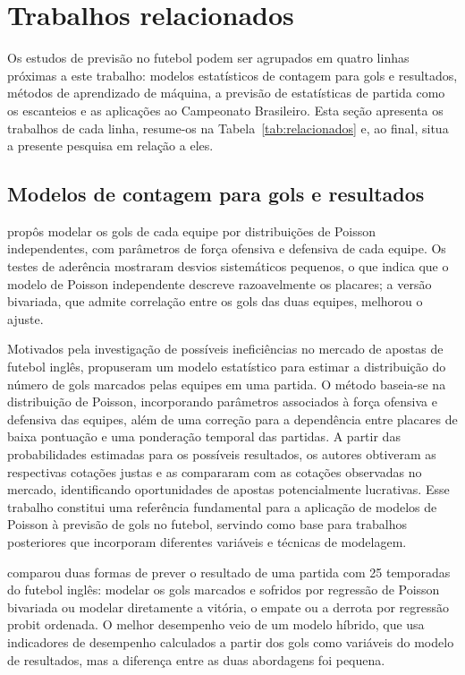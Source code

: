 \section{Trabalhos relacionados}\label{sec:Related}

Os estudos de previsão no futebol podem ser agrupados em quatro linhas próximas a este trabalho: modelos estatísticos de contagem para gols e resultados, métodos de aprendizado de máquina, a previsão de estatísticas de partida como os escanteios e as aplicações ao Campeonato Brasileiro. Esta seção apresenta os trabalhos de cada linha, resume-os na Tabela~\ref{tab:relacionados} e, ao final, situa a presente pesquisa em relação a eles.

\subsection{Modelos de contagem para gols e resultados}\label{subsec:RelPoisson}

 propôs modelar os gols de cada equipe por distribuições de Poisson independentes, com parâmetros de força ofensiva e defensiva de cada equipe. Os testes de aderência mostraram desvios sistemáticos pequenos, o que indica que o modelo de Poisson independente descreve razoavelmente os placares; a versão bivariada, que admite correlação entre os gols das duas equipes, melhorou o ajuste.

Motivados pela investigação de possíveis ineficiências no mercado de apostas de futebol inglês,  propuseram um modelo estatístico para estimar a distribuição do número de gols marcados pelas equipes em uma partida. O método baseia-se na distribuição de Poisson, incorporando parâmetros associados à força ofensiva e defensiva das equipes, além de uma correção para a dependência entre placares de baixa pontuação e uma ponderação temporal das partidas. A partir das probabilidades estimadas para os possíveis resultados, os autores obtiveram as respectivas cotações justas e as compararam com as cotações observadas no mercado, identificando oportunidades de apostas potencialmente lucrativas. Esse trabalho constitui uma referência fundamental para a aplicação de modelos de Poisson à previsão de gols no futebol, servindo como base para trabalhos posteriores que incorporam diferentes variáveis e técnicas de modelagem.

 comparou duas formas de prever o resultado de uma partida com 25 temporadas do futebol inglês: modelar os gols marcados e sofridos por regressão de Poisson bivariada ou modelar diretamente a vitória, o empate ou a derrota por regressão probit ordenada. O melhor desempenho veio de um modelo híbrido, que usa indicadores de desempenho calculados a partir dos gols como variáveis do modelo de resultados, mas a diferença entre as duas abordagens foi pequena.

